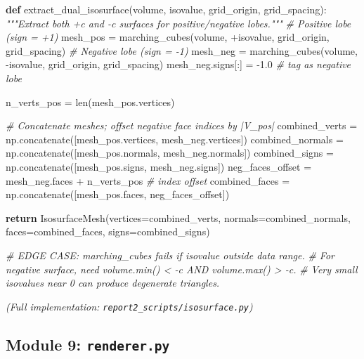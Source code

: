 \documentclass[
  11pt,
]{report}
\newenvironment{Shaded}{}{}
\newcommand{\BuiltInTok}[1]{\textcolor[rgb]{0.00,0.50,0.00}{#1}}
\newcommand{\CommentTok}[1]{\textcolor[rgb]{0.38,0.63,0.69}{\textit{#1}}}
\newcommand{\ControlFlowTok}[1]{\textcolor[rgb]{0.00,0.44,0.13}{\textbf{#1}}}
\newcommand{\FloatTok}[1]{\textcolor[rgb]{0.25,0.63,0.44}{#1}}
\newcommand{\KeywordTok}[1]{\textcolor[rgb]{0.00,0.44,0.13}{\textbf{#1}}}
\newcommand{\NormalTok}[1]{#1}
\newcommand{\OperatorTok}[1]{\textcolor[rgb]{0.40,0.40,0.40}{#1}}
\begin{document}
\begin{Shaded}
\begin{Highlighting}[]
\KeywordTok{def}\NormalTok{ extract\_dual\_isosurface(volume, isovalue, grid\_origin, grid\_spacing):}
    \CommentTok{"""Extract both +c and {-}c surfaces for positive/negative lobes."""}
    \CommentTok{\# Positive lobe (sign = +1)}
\NormalTok{    mesh\_pos }\OperatorTok{=}\NormalTok{ marching\_cubes(volume, }\OperatorTok{+}\NormalTok{isovalue, grid\_origin, grid\_spacing)}
    \CommentTok{\# Negative lobe (sign = {-}1)}
\NormalTok{    mesh\_neg }\OperatorTok{=}\NormalTok{ marching\_cubes(volume, }\OperatorTok{{-}}\NormalTok{isovalue, grid\_origin, grid\_spacing)}
\NormalTok{    mesh\_neg.signs[:] }\OperatorTok{=} \OperatorTok{{-}}\FloatTok{1.0}                 \CommentTok{\# tag as negative lobe}

\NormalTok{    n\_verts\_pos }\OperatorTok{=} \BuiltInTok{len}\NormalTok{(mesh\_pos.vertices)}

    \CommentTok{\# Concatenate meshes; offset negative face indices by |V\_pos|}
\NormalTok{    combined\_verts   }\OperatorTok{=}\NormalTok{ np.concatenate([mesh\_pos.vertices, mesh\_neg.vertices])}
\NormalTok{    combined\_normals }\OperatorTok{=}\NormalTok{ np.concatenate([mesh\_pos.normals, mesh\_neg.normals])}
\NormalTok{    combined\_signs   }\OperatorTok{=}\NormalTok{ np.concatenate([mesh\_pos.signs, mesh\_neg.signs])}
\NormalTok{    neg\_faces\_offset }\OperatorTok{=}\NormalTok{ mesh\_neg.faces }\OperatorTok{+}\NormalTok{ n\_verts\_pos   }\CommentTok{\# index offset}
\NormalTok{    combined\_faces   }\OperatorTok{=}\NormalTok{ np.concatenate([mesh\_pos.faces, neg\_faces\_offset])}

    \ControlFlowTok{return}\NormalTok{ IsosurfaceMesh(vertices}\OperatorTok{=}\NormalTok{combined\_verts, normals}\OperatorTok{=}\NormalTok{combined\_normals,}
\NormalTok{                          faces}\OperatorTok{=}\NormalTok{combined\_faces, signs}\OperatorTok{=}\NormalTok{combined\_signs)}

    \CommentTok{\# EDGE CASE: marching\_cubes fails if isovalue outside data range.}
    \CommentTok{\# For negative surface, need volume.min() \textless{} {-}c AND volume.max() \textgreater{} {-}c.}
    \CommentTok{\# Very small isovalues near 0 can produce degenerate triangles.}
\end{Highlighting}
\end{Shaded}

\emph{(Full implementation: \texttt{report2\_scripts/isosurface.py})}

\subsection{\texorpdfstring{Module 9:
\texttt{renderer.py}}{Module 9: renderer.py}}\label{module-9-renderer.py}
\end{document}
